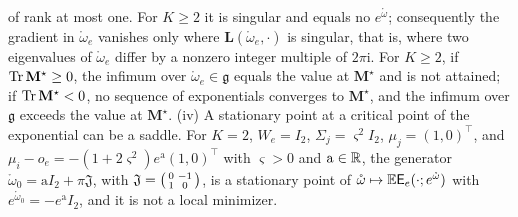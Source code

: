 of rank at most one. For \(K\geq2\) it is singular and equals no \(e^{\mathring\omega}\);
consequently the gradient in \(\mathring\omega_e\) vanishes only where \(\mathbf L(\mathring\omega_e,\cdot)\)
is singular, that is, where two eigenvalues of \(\mathring\omega_e\) differ by a nonzero integer
multiple of \(2\pi\mathrm i\). For \(K\geq2\), if \(\operatorname{Tr}\mathbf M^\star\geq0\), the infimum over
\(\mathring\omega_e\in\mathfrak g\) equals the value at \(\mathbf M^\star\) and is not attained; if
\(\operatorname{Tr}\mathbf M^\star<0\), no sequence of exponentials converges to \(\mathbf M^\star\), and the
infimum over \(\mathfrak g\) exceeds the value at \(\mathbf M^\star\).
(iv) A stationary point at a critical point of the exponential can be a saddle. For \(K=2\),
\(W_e=I_2\), \(\Sigma_j=\varsigma^2I_2\), \(\mu_j=(1,0)^\top\), and
\(\mu_i-o_e=-(1+2\varsigma^2)e^{\mathrm a}(1,0)^\top\) with \(\varsigma>0\) and \(\mathrm a\in\mathbb R\), the
generator \(\mathring\omega_0=\mathrm aI_2+\pi\mathfrak J\), with
\(\mathfrak J=\begin{psmallmatrix}0&-1\\1&0\end{psmallmatrix}\), is a stationary point of
\(\mathring\omega\mapsto\mathbb E\mathsf E_e(\cdot;e^{\mathring\omega})\) with
\(e^{\mathring\omega_0}=-e^{\mathrm a}I_2\), and it is not a local minimizer.

